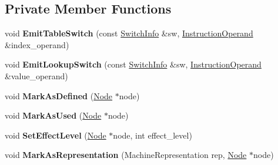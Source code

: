 \subsection*{Private Member Functions}
\begin{DoxyCompactItemize}
\item 
void {\bfseries Emit\+Table\+Switch} (const \hyperlink{structv8_1_1internal_1_1compiler_1_1_switch_info}{Switch\+Info} \&sw, \hyperlink{classv8_1_1internal_1_1compiler_1_1_instruction_operand}{Instruction\+Operand} \&index\+\_\+operand)\hypertarget{classv8_1_1internal_1_1compiler_1_1_instruction_selector_adf53774f208fb6b34a034f987430603c}{}\label{classv8_1_1internal_1_1compiler_1_1_instruction_selector_adf53774f208fb6b34a034f987430603c}

\item 
void {\bfseries Emit\+Lookup\+Switch} (const \hyperlink{structv8_1_1internal_1_1compiler_1_1_switch_info}{Switch\+Info} \&sw, \hyperlink{classv8_1_1internal_1_1compiler_1_1_instruction_operand}{Instruction\+Operand} \&value\+\_\+operand)\hypertarget{classv8_1_1internal_1_1compiler_1_1_instruction_selector_a1b39ec0c128eada6dedceea28891cc58}{}\label{classv8_1_1internal_1_1compiler_1_1_instruction_selector_a1b39ec0c128eada6dedceea28891cc58}

\item 
void {\bfseries Mark\+As\+Defined} (\hyperlink{classv8_1_1internal_1_1compiler_1_1_node}{Node} $\ast$node)\hypertarget{classv8_1_1internal_1_1compiler_1_1_instruction_selector_a7281edcc98d3ec437f0fa8f408d3220a}{}\label{classv8_1_1internal_1_1compiler_1_1_instruction_selector_a7281edcc98d3ec437f0fa8f408d3220a}

\item 
void {\bfseries Mark\+As\+Used} (\hyperlink{classv8_1_1internal_1_1compiler_1_1_node}{Node} $\ast$node)\hypertarget{classv8_1_1internal_1_1compiler_1_1_instruction_selector_a562d18923f5e734f1be9139386ddb428}{}\label{classv8_1_1internal_1_1compiler_1_1_instruction_selector_a562d18923f5e734f1be9139386ddb428}

\item 
void {\bfseries Set\+Effect\+Level} (\hyperlink{classv8_1_1internal_1_1compiler_1_1_node}{Node} $\ast$node, int effect\+\_\+level)\hypertarget{classv8_1_1internal_1_1compiler_1_1_instruction_selector_a32f9f5e2913e4d20616d3c8b93dc87fd}{}\label{classv8_1_1internal_1_1compiler_1_1_instruction_selector_a32f9f5e2913e4d20616d3c8b93dc87fd}

\item 
void {\bfseries Mark\+As\+Representation} (Machine\+Representation rep, \hyperlink{classv8_1_1internal_1_1compiler_1_1_node}{Node} $\ast$node)\hypertarget{classv8_1_1internal_1_1compiler_1_1_instruction_selector_a1932bd57cbba45829f083ba5ebd7e4d0}{}\label{classv8_1_1internal_1_1compiler_1_1_instruction_selector_a1932bd57cbba45829f083ba5ebd7e4d0}


\end{DoxyCompactItemize}
